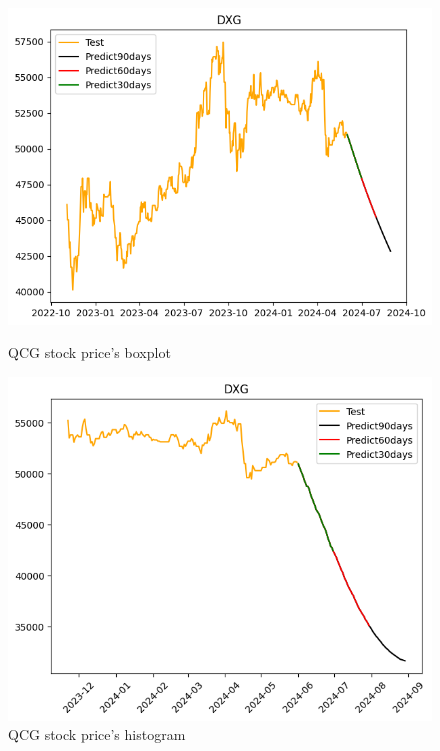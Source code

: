 \documentclass{ieeeojies}
\begin{document}
\begin{figure}[H]
  \centering
  \begin{minipage}{0.23\textwidth}
  \centering
  \includegraphics[width=1\textwidth]{bibliography/Figure/GRU_7-3.png}
  \caption{QCG stock price's boxplot}
  \label{fig:1}
  \end{minipage}
  \hfill
  \begin{minipage}{0.23\textwidth}
  \centering
  \includegraphics[width=1\textwidth]{bibliography/Figure/RNN_9-1.png}
  \caption{QCG stock price's histogram}
  \label{fig:2}
  \end{minipage}
\end{figure}
\end{document}
